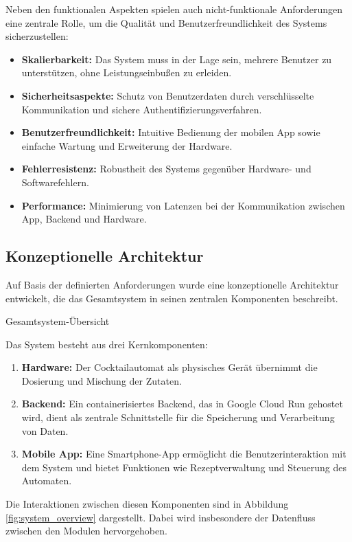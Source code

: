 Neben den funktionalen Aspekten spielen auch nicht-funktionale Anforderungen eine zentrale Rolle, 
um die Qualität und Benutzerfreundlichkeit des Systems sicherzustellen:

\begin{itemize}
	  \item	\textbf{Skalierbarkeit:} Das System muss in der Lage sein, mehrere Benutzer zu unterstützen, ohne Leistungseinbußen zu erleiden.
	  \item	\textbf{Sicherheitsaspekte:} Schutz von Benutzerdaten durch verschlüsselte Kommunikation und sichere Authentifizierungsverfahren.
	  \item	\textbf{Benutzerfreundlichkeit:} Intuitive Bedienung der mobilen App sowie einfache Wartung und Erweiterung der Hardware.
	  \item	\textbf{Fehlerresistenz:} Robustheit des Systems gegenüber Hardware- und Softwarefehlern.
	  \item	\textbf{Performance:} Minimierung von Latenzen bei der Kommunikation zwischen App, Backend und Hardware.
\end{itemize}

\subsection{Konzeptionelle Architektur}

Auf Basis der definierten Anforderungen wurde eine konzeptionelle Architektur entwickelt, die das 
Gesamtsystem in seinen zentralen Komponenten beschreibt.

Gesamtsystem-Übersicht

Das System besteht aus drei Kernkomponenten:

\begin{enumerate}
  \item \textbf{Hardware:} Der Cocktailautomat als physisches Gerät übernimmt die Dosierung und Mischung der Zutaten.
  \item \textbf{Backend:} Ein containerisiertes Backend, das in Google Cloud Run gehostet wird, dient als zentrale Schnittstelle für die Speicherung und Verarbeitung von Daten.
  \item \textbf{Mobile App:} Eine Smartphone-App ermöglicht die Benutzerinteraktion mit dem System und bietet Funktionen wie Rezeptverwaltung und Steuerung des Automaten.
\end{enumerate}

Die Interaktionen zwischen diesen Komponenten sind in Abbildung \ref{fig:system_overview} 
dargestellt. Dabei wird insbesondere der Datenfluss zwischen den Modulen hervorgehoben.

